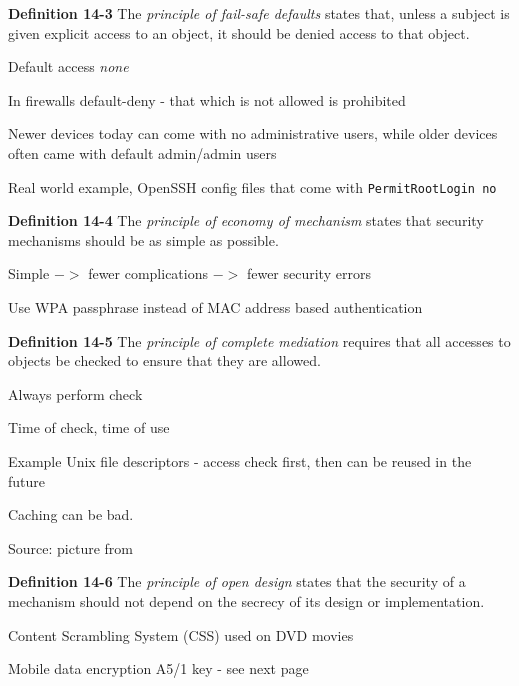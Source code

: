 \documentclass[Screen16to9,17pt]{foils}
\begin{document}

\begin{list1}
\item {\bf Definition 14-3} The \emph{principle of fail-safe defaults} states that, unless a subject is given explicit access to an object, it should be denied access to that object.
\item Default access \emph{none}
\item In firewalls default-deny - that which is not allowed is prohibited
\item Newer devices today can come with no administrative users, while older devices often came with default admin/admin users
\item Real world example, OpenSSH config files that come with \verb+PermitRootLogin no+
\end{list1}



\begin{list1}
\item {\bf Definition 14-4} The \emph{principle of economy of mechanism} states that security mechanisms should be as simple as possible.
\item Simple $->$ fewer complications $->$ fewer security errors
\item Use WPA passphrase instead of MAC address based authentication
\item
\end{list1}



\begin{list1}
\item {\bf Definition 14-5} The \emph{principle of complete mediation} requires that all accesses to objects be checked to ensure that they are allowed.
\item Always perform check
\item Time of check, time of use
\item Example Unix file descriptors - access check first, then can be reused in the future
\item Caching can be bad.
\end{list1}




Source: picture from 
\begin{list1}
\item {\bf Definition 14-6} The \emph{principle of open design} states that the security of a mechanism should not depend on the secrecy of its design or implementation.
\item Content Scrambling System (CSS) used on DVD movies
\item Mobile data encryption  A5/1 key - see next page
\end{list1}
\end{document}
